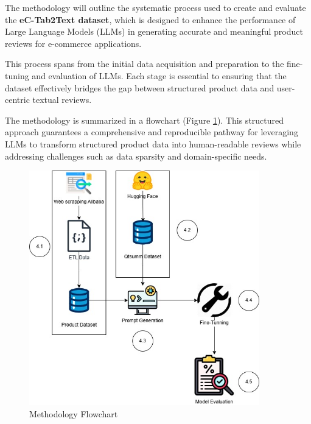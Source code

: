 The methodology will outline the systematic process used to create and evaluate the \textbf{eC-Tab2Text dataset}, which is designed to enhance the performance of Large Language Models (LLMs) in generating accurate and meaningful product reviews for e-commerce applications.

This process spans from the initial data acquisition and preparation to the fine-tuning and evaluation of LLMs. Each stage is essential to ensuring that the dataset effectively bridges the gap between structured product data and user-centric textual reviews.

The methodology is summarized in a flowchart (Figure \ref{fig:MethodologyFlowchart}). This structured approach guarantees a comprehensive and reproducible pathway for leveraging LLMs to transform structured product data into human-readable reviews while addressing challenges such as data sparsity and domain-specific needs.
\begin{figure}[H]
    \centering
    \includegraphics[width=10cm]{images/Methodology.jpg}
    \caption{Methodology Flowchart}
    \label{fig:MethodologyFlowchart}
\end{figure}
